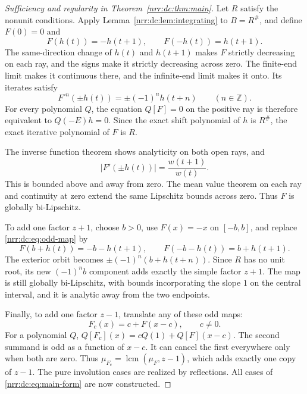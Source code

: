\documentclass[11pt,letterpaper]{article}
\theoremstyle{definition}
\theoremstyle{remark}
\newcommand{\Z}{\mathbb Z}
\DeclareMathOperator{\lcm}{lcm}
\begin{document}
\begin{proof}[Sufficiency and regularity in Theorem~\ref{nrr:dc:thm:main}]
Let $R$ satisfy the nonunit conditions. Apply
Lemma~\ref{nrr:dc:lem:integrating} to $B=R^\#$, and define $F(0)=0$ and
\begin{equation}
 F(h(t))=-h(t+1),\qquad F(-h(t))=h(t+1).
 \label{nrr:dc:eq:odd-map}
\end{equation}
The same-direction change of $h(t)$ and $h(t+1)$ makes $F$ strictly
decreasing on each ray, and the signs make it strictly decreasing
across zero. The finite-end limit makes it continuous there, and the
infinite-end limit makes it onto. Its iterates satisfy
\begin{equation}
 F^{\circ n}(\pm h(t))=\pm(-1)^n h(t+n)
 \qquad(n\in\Z).
 \label{nrr:dc:eq:odd-orbit}
\end{equation}
For every polynomial $Q$, the equation $Q[F]=0$ on the positive ray
is therefore equivalent to $Q(-E)h=0$. Since the exact shift polynomial
of $h$ is $R^\#$, the exact iterative polynomial of $F$ is $R$.

The inverse function theorem shows analyticity on both open rays, and
\begin{equation}
 |F'(\pm h(t))|=\frac{w(t+1)}{w(t)}.
 \label{nrr:dc:eq:slope}
\end{equation}
This is bounded above and away from zero. The mean value theorem on
each ray and continuity at zero extend the same Lipschitz bounds across
zero. Thus $F$ is globally bi-Lipschitz.

To add one factor $z+1$, choose $b>0$, use $F(x)=-x$ on $[-b,b]$,
and replace \eqref{nrr:dc:eq:odd-map} by
\begin{equation}
 F(b+h(t))=-b-h(t+1),\qquad
 F(-b-h(t))=b+h(t+1).
 \label{nrr:dc:eq:plateau-general}
\end{equation}
The exterior orbit becomes
$\pm(-1)^n(b+h(t+n))$. Since $R$ has no unit root, its new
$(-1)^n b$ component adds exactly the simple factor $z+1$.
The map is still globally bi-Lipschitz, with bounds incorporating the
slope $1$ on the central interval, and it is analytic away from the
two endpoints.

Finally, to add one factor $z-1$, translate any of these odd maps:
\begin{equation}
 F_c(x)=c+F(x-c),\qquad c\ne0.
 \label{nrr:dc:eq:translate}
\end{equation}
For a polynomial $Q$,
$Q[F_c](x)=cQ(1)+Q[F](x-c)$. The second summand is odd as a function
of $x-c$. It can cancel the first everywhere only when both are zero.
Thus $\mu_{F_c}=\lcm(\mu_F,z-1)$, which adds exactly one copy of
$z-1$. The pure involution cases are realized by reflections.
All cases of \eqref{nrr:dc:eq:main-form} are now constructed.
\end{proof}
\end{document}
